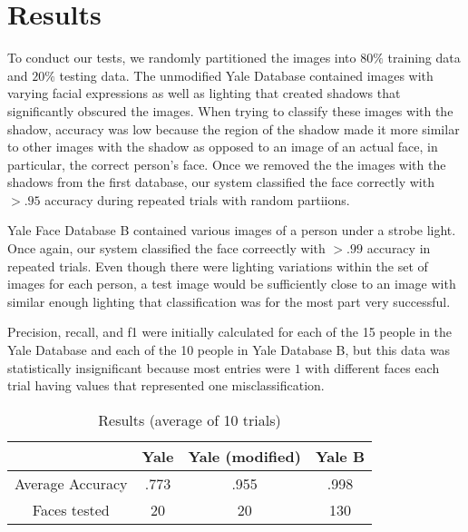 \documentclass[letterpaper]{article}
\begin{document}
\section{Results}
To conduct our tests, we randomly partitioned the images into $80\%$ training data and $20\%$ testing data.  The unmodified Yale Database contained images with varying facial expressions as well as lighting that created shadows that significantly obscured the images.  When trying to classify these images with the shadow, accuracy was low because the region of the shadow made it more similar to other images with the shadow as opposed to an image of an actual face, in particular, the correct person's face. Once we removed the the images with the shadows from the first database, our system classified the face correctly with $>.95$ accuracy during repeated trials with random partiions.

Yale Face Database B contained various images of a person under a strobe light.  Once again, our system classified the face correectly with $>.99$ accuracy in repeated trials.  Even though there were lighting variations within the set of images for each person, a test image would be sufficiently close to an image with similar enough lighting that classification was for the most part very successful. 

Precision, recall, and f1 were initially calculated for each of the 15 people in the Yale Database and each of the 10 people in Yale Database B, but this data was statistically insignificant because most entries were $1$ with different faces each trial having values that represented one misclassification. 

\begin{table}
\begin{center}
\caption{Results (average of 10 trials)}
\begin {tabular} {|c|c|c|c|}
\hline
& \textrm{Yale} & \textrm{Yale (modified)} & \textrm{Yale B}\\
\hline
Average Accuracy & .773  & .955 & .998  \\
\hline
Faces tested & 20 & 20  & 130  \\
\hline
\end {tabular}
\end{center}
\end{table}
\end{document}
